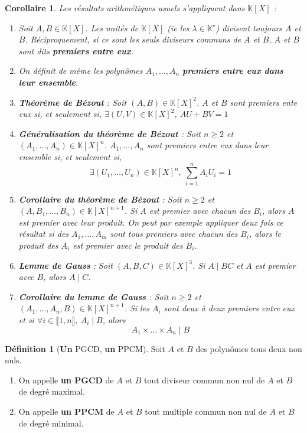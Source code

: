 \documentclass[french]{book}
\newcommand{\K}{\mathbb{K}}
\newcommand{\st}{^\star}
\theoremstyle{plain}
\newtheorem{cor}{Corollaire}[chapter]
\theoremstyle{definition}
\newtheorem{dfn}{Définition}[chapter]
\theoremstyle{remark}
\begin{document}
\begin{cor}
	Les résultats arithmétiques usuels s'appliquent dans $\K[X]$ :
	\begin{enumerate}
		\item Soit $A,B\in\K[X]$. Les unités de $\K[X]$ (ie les $\lambda\in\K\st$) divisent toujours $A$ et $B$. Réciproquement, si ce sont les seuls diviseurs communs de $A$ et $B$, $A$ et $B$ sont dits \textbf{premiers entre eux}.
		\item On définit de même les polynômes $A_1,\ldots,A_n$ \textbf{premiers entre eux dans leur ensemble}.
		\item \textbf{Théorème de Bézout} : Soit $(A,B)\in\K[X]^2$. $A$ et $B$ sont premiers ente eux si, et seulement si, $\exists(U,V)\in\K[X]^2, \ AU+BV=1$
		\item \textbf{Généralisation du théorème de Bézout} : Soit $n\geqslant2$ et $(A_1,\ldots,A_n)\in\K[X]^n$. $A_1,\ldots,A_n$ sont premiers entre eux dans leur ensemble si, et seulement si, $$\exists(U_1,\ldots,U_n)\in\K[X]^n,\ \sum_{i=1}^{n}A_iU_i=1$$
		\item\textbf{ Corollaire du théorème de Bézout} : Soit $n\geqslant2$ et $(A,B_1,\ldots,B_n)\in\K[X]^{n+1}$. Si $A$ est premier avec chacun des $B_i$, alors $A$ est premier avec leur produit.  On peut par exemple appliquer deux fois ce résultat si des $A_1,\ldots,A_m$ sont tous premiers avec chacun des $B_i$, alors le produit des $A_i$ est premier avec le produit des $B_i$.
		\item \textbf{Lemme de Gauss }: Soit $(A,B,C)\in\K[X]^3$. Si $A\mid BC$ et $A$ est premier avec $B$, alors $A\mid C$.
		\item \textbf{Corollaire du lemme de Gauss} : Soit $n\geqslant2$ et $(A_1,\ldots,A_n,B)\in\K[X]^{n+1}$. Si les $A_i$ sont deux à deux premiers entre eux et si $\forall i\in\llbracket1,n\rrbracket,\ A_i\mid B$, alors $$A_1\times\ldots\times A_n\mid B$$
	\end{enumerate}
\end{cor}
\begin{dfn}[\textbf{Un} PGCD, \textbf{un} PPCM]
	Soit $A$ et $B$ des polynômes tous deux non nuls.
	\begin{enumerate}
		\item On appelle \textbf{un PGCD} de $A$ et $B$ tout diviseur commun non nul de $A$ et $B$ de degré maximal.
		\item On appelle \textbf{un PPCM} de $A$ et $B$ tout multiple commun non nul de $A$ et $B$ de degré minimal.
	\end{enumerate}
\end{dfn}
\end{document}
